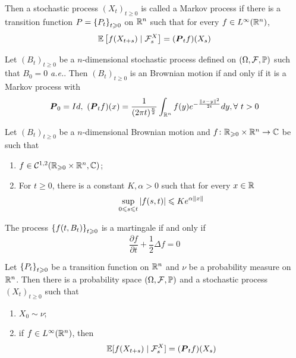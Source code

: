 \documentclass[a4paper,12pt]{article}
\begin{document}
\begin{itemize}
  Then a stochastic process $(X_t)_{t \geqslant 0}$ is called a Markov process if there is a transition function $P = \left\{P_t\right\}_{t \geqslant 0}$ on $\mathbb{R}^n$ such that for every $f \in L^{\infty}(\mathbb{R}^n)$,
  \begin{equation*}
    \mathbb{E}\left[f(X_{t+s}) \mid \mathcal{F}^X_s\right] = (\boldsymbol{P}_tf)(X_s)
  \end{equation*}

  \begin{prop}
    Let $(B_t)_{t \geqslant 0}$ be a $n$-dimensional stochastic process defined on $(\Omega,\mathcal{F},\mathbb{P})$ such that $B_0 = 0$ \emph{a.e.}. Then $(B_t)_{t \geqslant 0}$ is an Brownian motion if and only if it is a Markov process with
    \begin{equation*}
      \boldsymbol{P}_0 = Id,~(\boldsymbol{P}_tf)(x) = \frac{1}{(2\pi t)^{\frac{n}{2}}}\int_{\mathbb{R}^n}f(y)e^{-\frac{\left\lVert x-y\right\lVert^2}{2t}}dy,\forall~t > 0
    \end{equation*}
  \end{prop}

  \begin{thm}
    Let $(B_t)_{t \geqslant 0}$ be a $n$-dimensional Brownian motion and $f \colon \mathbb{R}_{\geqslant 0} \times \mathbb{R}^n \rightarrow \mathbb{C}$ be such that
    \begin{enumerate}[label=(\roman*)]
      \item $f \in \mathcal{C}^{1,2}(\mathbb{R}_{\geqslant 0} \times \mathbb{R}^n, \mathbb{C})$;
      \item For $t \geqslant 0$, there is a constant $K, \alpha> 0$ such that for every $x \in \mathbb{R}$
      \begin{equation*}
        \sup_{0\leqslant s \leqslant t}\left\lvert f(s,t)\right\lvert \leqslant Ke^{\alpha\left\lVert x\right\lVert}
      \end{equation*}
    \end{enumerate}
    The process $\left\{f(t,B_t)\right\}_{t \geqslant 0}$ is a martingale if and only if
    \begin{equation*}
      \frac{\partial f}{\partial t} + \frac{1}{2}\Delta f = 0
    \end{equation*}
  \end{thm}

  \begin{thm}
    Let $\left\{P_t\right\}_{t \geqslant 0}$ be a transition function on $\mathbb{R}^n$ and $\nu$ be a probability measure on $\mathbb{R}^n$. Then there is a probability space $(\Omega, \mathcal{F}, \mathbb{P})$ and a stochastic process $(X_t)_{t \geqslant 0}$ such that
    \begin{enumerate}[label=(\arabic*)]
      \item $X_0 \sim \nu$;
      \item if $f \in L^{\infty}(\mathbb{R}^n)$, then
      \begin{equation*}
        \mathbb{E}[f(X_{t+s}) \mid \mathcal{F}^X_{s}] = (\boldsymbol{P}_tf)(X_s)
      \end{equation*}
    \end{enumerate}
  \end{thm}


\end{itemize}
\end{document}
